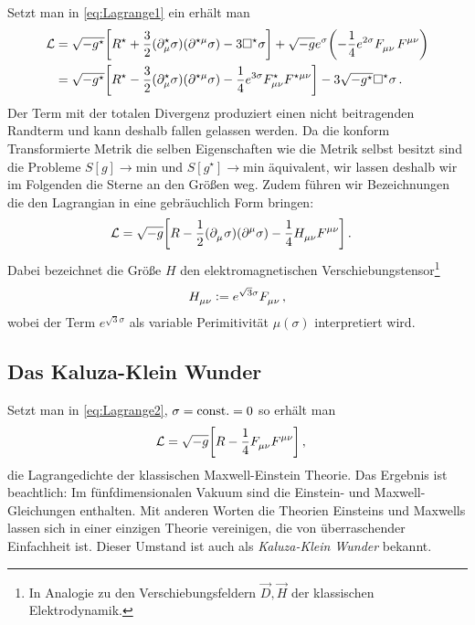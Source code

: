 Setzt man in \eqref{eq:Lagrange1} ein erhält man
\begin{equation}
\begin{split}
\mathcal{L}&=\sqrt{-g^\star}\left[R^\star
+\frac{3}{2}(\tensor*{\partial}{^\star_\mu}\sigma)(\tensor{\partial}{^\star^\mu}\sigma)
-3\square^\star\sigma\right]
+\sqrt{-g}e^{\sigma}\left(-\frac{1}{4}e^{2\sigma}\tensor{F}{_\mu_\nu}\tensor{F}{^\mu^\nu}\right)\\
&=\sqrt{-g^\star}\left[R^\star
-\frac{3}{2}(\tensor*{\partial}{^\star_\mu}\sigma)(\tensor{\partial}{^\star^\mu}\sigma)
-\frac{1}{4}e^{3\sigma}\tensor*{F}{^\star_\mu_\nu}\tensor*{F}{^\star^\mu^\nu}\right]-3\sqrt{-g^\star}\square^\star\sigma\,.
\end{split}
\end{equation}
Der Term mit der totalen Divergenz produziert einen nicht beitragenden Randterm
und kann deshalb fallen gelassen werden. 
Da die konform Transformierte Metrik die selben Eigenschaften wie die Metrik
selbst besitzt sind die Probleme $S[g]\to\text{min}$ und
$S\left[g^\star\right]\to\text{min}$ äquivalent, wir lassen deshalb wir im
Folgenden die Sterne an den Größen weg. 
Zudem führen wir Bezeichnungen die den Lagrangian in eine gebräuchlich Form
bringen:
\begin{equation}
\begin{split}
\mathcal{L}
&=\sqrt{-g}\left[R
-\frac{1}{2}(\tensor{\partial}{_\mu}\sigma)(\tensor{\partial}{^\mu}\sigma)
-\frac{1}{4}\tensor*{H}{_\mu_\nu}\tensor*{F}{^\mu^\nu}\right]\,.
\label{eq:Lagrange2}
\end{split}
\end{equation}
Dabei bezeichnet die
Größe $H$ den elektromagnetischen Verschiebungstensor\footnote{In Analogie zu
den Verschiebungsfeldern $\vec{D},\vec{H}$ der klassischen Elektrodynamik.
}
\begin{equation}
\tensor*{H}{_\mu_\nu}:=e^{\sqrt{3}\sigma}\tensor*{F}{_\mu_\nu}\,,
\end{equation}
wobei der Term $e^{\sqrt{3}\sigma}$ als variable Perimitivität $\mu(\sigma)$
interpretiert wird. 
\subsection{Das Kaluza-Klein Wunder}
Setzt man in \eqref{eq:Lagrange2}, $\sigma=\mathrm{const.}=0$  so erhält man 
\begin{equation}\label{eq:Lagrange2}
\begin{split}
\mathcal{L}
&=\sqrt{-g}\left[R-\frac{1}{4}\tensor*{F}{_\mu_\nu}\tensor*{F}{^\mu^\nu}\right]\,,
\end{split}
\end{equation}
die Lagrangedichte der klassischen
Maxwell-Einstein Theorie. 
Das Ergebnis ist beachtlich: Im fünfdimensionalen Vakuum sind die Einstein- und
Maxwell-Gleichungen enthalten.
Mit anderen Worten die Theorien Einsteins
und Maxwells lassen sich in einer einzigen Theorie vereinigen, die von 
überraschender Einfachheit ist. Dieser Umstand ist auch als
\emph{Kaluza-Klein Wunder} bekannt.

